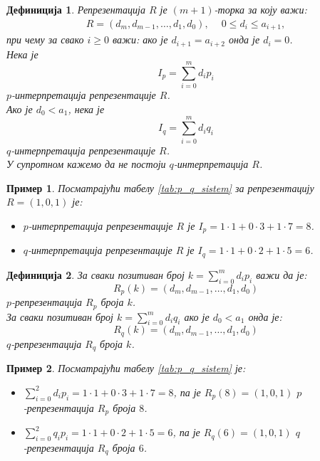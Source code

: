 \documentclass[a4paper]{article}
\newtheorem{example}{Пример}
\newtheorem{definition}{Дефиниција}
\begin{document}
\begin{definition}
	Репрезентација $ R $ је  $ (m+1) $-торка за коју важи:
		\begin{eqnarray}
			R = (d_{m}, d_{m-1}, \ldots , d_{1}, d_{0}), \quad \ 0 \le d_{i} \le a_{i+1},
		\end{eqnarray}
	при чему за свако $ i \ge 0 $ важи: ако је $ d_{i+1} = a_{i+2} $ онда је $ d_{i} = 0 $.\\
	Нека је 
		\begin{displaymath}
			I_{p} = \sum_{i=0}^{m} d_{i}p_{i}
		\end{displaymath} 		
	$ p $-интерпретација репрезентације $ R $.\\ 
	Ако је $ d_{0} < a_{1} $, нека је 
		\begin{displaymath}
			I_{q} = \sum_{i=0}^{m} d_{i}q_{i}
		\end{displaymath}  
	$ q $-интерпретација репрезентације $ R $.\\ 
	У супротном кажемо да не постоји $ q $-интерпретација $ R $.
\end{definition}

\begin{example}
	Посматрајући табелу \ref{tab:p_q_sistem} за репрезентацију $ R = (1, 0, 1) $ је: 
	\begin{itemize}
		\item $ p $-интерпретација репрезентације $ R $ је $ I_{p} = 1 \cdot 1 + 0 \cdot 3 + 1 \cdot 7 = 8 $.
		\item $ q $-интерпретација репрезентације $ R $ је $ I_{q} = 1 \cdot 1 + 0 \cdot 2 + 1 \cdot 5 = 6 $.
	\end{itemize}
\end{example}

\begin{definition}
	За сваки позитиван број $ k = \sum_{i=0}^{m} d_{i}p_{i} $ важи да је: 	
		\begin{displaymath}
			R_{p}(k) = (d_{m}, d_{m-1}, \ldots , d_{1}, d_{0})
		\end{displaymath}	
	$ p $-репрезентација $ R_{p} $ броја $ k $.\\
	За сваки позитиван број $ k = \sum_{i=0}^{m} d_{i}q_{i} $ ако је $ d_{0} < a_{1} $ онда је:	
		\begin{displaymath}
			R_{q}(k) = (d_{m}, d_{m-1}, \ldots , d_{1}, d_{0})
		\end{displaymath}	
	 $ q $-репрезентација $ R_{q} $ броја $ k $.
\end{definition}

\begin{example}
	Посматрајући табелу \ref{tab:p_q_sistem} је:
		\begin{itemize}
			\item $ \sum_{i=0}^{2} d_{i}p_{i} = 1 \cdot 1 + 0 \cdot 3 + 1 \cdot 7 = 8 $, па је $ R_{p}(8) = (1, 0, 1) $ $ p $-репрезентација $ R_{p} $ броја $ 8 $. 
			\item $ \sum_{i=0}^{2} q_{i}p_{i} = 1 \cdot 1 + 0 \cdot 2 + 1 \cdot 5 = 6 $, па је $ R_{q}(6) = (1, 0, 1) $ $ q $-репрезентација $ R_{q} $ броја $ 6 $.
		\end{itemize}
\end{example}
\end{document}
